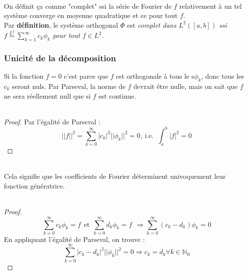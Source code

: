 \documentclass[british,french,11pt, a4paper, openany]{book}
\newcommand{\serie}{\sum_{k=1}^\infty}
\newcommand{\series}{\sum_{k=0}^\infty}
\begin{document}
		\theor{Si $f_{L^2} = \serie c_k\phi_k$ alors $\serie |c_k|^2||\phi_k||^2 \leq ||f||^2$}\ \\
									
		On définit ça comme "complet" ssi la série de Fourier de $f$ relativement à un tel système converge en moyenne quadratique et ce pour tout $f$.\\
									
		Par \textbf{définition}, le système orthogonal $\Phi$ est \textit{complet dans $L^2([a,b])$ ssi $f \overset{L^2}{=}\serie c_k\phi_k$ pour tout $f \in L^2$}.
									
									
		\subsubsection*{Unicité de la décomposition}
		Si la fonction $f = 0$ c'est parce que $f$ est orthogonale à tous le s$\phi_k$, donc tous les $c_k$ seront nuls. Par Parseval, la norme de $f$ devrait être nulle, mais on sait que $f$ ne sera réellement null que si $f$ est continue.\\
									
		\ \\
									
		\begin{proof}
			Par l'égalité de Parseval :
			\begin{equation}
				||f||^2 = \series |c_k|^2||\phi_k||^2  = 0,\ \text{i.e. }\ \int_a^b |f|^2 = 0
			\end{equation}
		\end{proof}
									
		\ \\
		Cela signifie que les coefficients de Fourier déterminent univoquement leur fonction génératrice.\\
									
									
		\ \\
		\begin{proof}
			\begin{equation}
				\series c_k\phi_k = f\ \ \text{et}\ \ \series d_k\phi_k = f\ \ \Rightarrow \series (c_k-d_k)\phi_k = 0
			\end{equation}
			En appliquant l'égalité de Parseval, on trouve : 
			\begin{equation}
				\series |c_k-d_k|^2||\phi_k||^2 = 0 \Rightarrow c_k = d_k \forall k \in \mathbb{N}_0
			\end{equation}
		\end{proof}
		\setcounter{subsection}{3}
\end{document}
